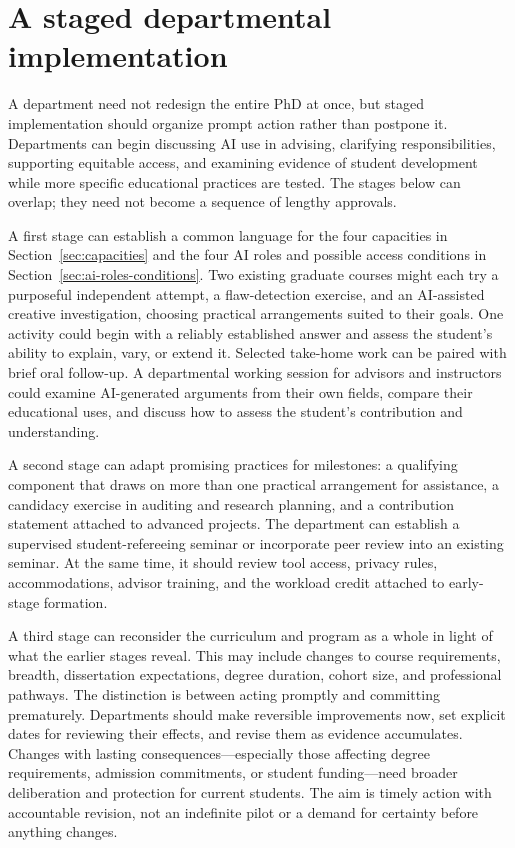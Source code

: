\documentclass[11pt]{article}
\begin{document}
\section{A staged departmental implementation}
\label{sec:staged-implementation}

A department need not redesign the entire PhD at once, but staged implementation should
organize prompt action rather than postpone it. Departments can begin discussing AI use
in advising, clarifying responsibilities, supporting equitable access, and examining
evidence of student development while more specific educational practices are tested.
The stages below can overlap; they need not become a sequence of lengthy approvals.

A first stage can establish a common language for the four capacities in
Section~\ref{sec:capacities} and the four AI roles and possible access conditions in
Section~\ref{sec:ai-roles-conditions}. Two existing graduate courses might each try a
purposeful independent attempt, a flaw-detection exercise, and an AI-assisted creative
investigation, choosing practical arrangements suited to their goals. One activity
could begin with a reliably established answer and assess the student's ability to
explain, vary, or extend it. Selected take-home work can be paired with brief oral
follow-up. A departmental working session for advisors and instructors could examine
AI-generated arguments from their own fields, compare their educational uses, and
discuss how to assess the student's contribution and understanding.

A second stage can adapt promising practices for milestones: a qualifying component
that draws on more than one practical arrangement for assistance, a candidacy exercise
in auditing and research planning, and a contribution statement attached to advanced
projects.  The department can establish a supervised
student-refereeing seminar or incorporate peer review into an existing seminar.  At the
same time, it should review tool access, privacy rules, accommodations, advisor training,
and the workload credit attached to early-stage formation.

A third stage can reconsider the curriculum and program as a whole in light of what the
earlier stages reveal.  This may include changes to course requirements, breadth,
dissertation expectations, degree duration, cohort size, and professional pathways.  The
distinction is between acting promptly and committing prematurely. Departments should
make reversible improvements now, set explicit dates for reviewing their effects, and
revise them as evidence accumulates. Changes with lasting consequences---especially
those affecting degree requirements, admission commitments, or student funding---need
broader deliberation and protection for current students. The aim is timely action
with accountable revision, not an indefinite pilot or a demand for certainty before
anything changes.
\end{document}
